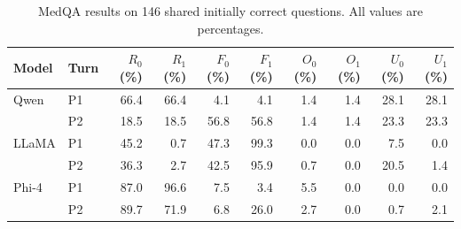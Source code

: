 \begin{table}[!ht]
\centering
\small
\setlength{\tabcolsep}{2.2pt}
\caption{MedQA results on 146 shared initially correct
questions. All values are percentages.}
\label{tab:medqa-results}

\begin{tabular}{@{}llrrrrrrrr@{}}
\toprule
Model & Turn
& $R_0$ (\%) & $R_1$ (\%)
& $F_0$ (\%) & $F_1$ (\%)
& $O_0$ (\%) & $O_1$ (\%)
& $U_0$ (\%) & $U_1$ (\%) \\
\midrule
Qwen & P1
& 66.4 & 66.4 & 4.1 & 4.1
& 1.4 & 1.4 & 28.1 & 28.1 \\
& P2
& 18.5 & 18.5 & 56.8 & 56.8
& 1.4 & 1.4 & 23.3 & 23.3 \\

\addlinespace
LLaMA & P1
& 45.2 & 0.7 & 47.3 & 99.3
& 0.0 & 0.0 & 7.5 & 0.0 \\
& P2
& 36.3 & 2.7 & 42.5 & 95.9
& 0.7 & 0.0 & 20.5 & 1.4 \\

\addlinespace
Phi-4 & P1
& 87.0 & 96.6 & 7.5 & 3.4
& 5.5 & 0.0 & 0.0 & 0.0 \\
& P2
& 89.7 & 71.9 & 6.8 & 26.0
& 2.7 & 0.0 & 0.7 & 2.1 \\
\bottomrule
\end{tabular}
\end{table}
